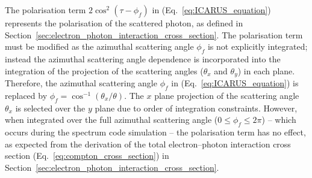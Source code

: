 \documentclass[../main.tex]{subfiles}
\begin{document}
The polarisation term $2\cos^{2}\left(\tau-\phi_{f}\right)$ in (Eq.~\ref{eq:ICARUS_equation}) represents the polarisation of the scattered photon, as defined in Section~\ref{sec:electron_photon_interaction_cross_section}. The polarisation term must be modified as the azimuthal scattering angle $\phi_{f}$ is not explicitly integrated; instead the azimuthal scattering angle dependence is incorporated into the integration of the projection of the scattering angles ($\theta_{x}$ and $\theta_{y}$) in each plane. Therefore, the azimuthal scattering angle $\phi_{f}$ in (Eq.~\ref{eq:ICARUS_equation}) is replaced by $\phi_{f} = \cos^{-1}\left(\theta_{x}/\theta\right)$. The $x$ plane projection of the scattering angle $\theta_{x}$ is selected over the $y$ plane due to order of integration constraints. However, when integrated over the full azimuthal scattering angle ($0 \leq \phi_{f} \leq 2\pi$) -- which occurs during the spectrum code simulation -- the polarisation term has no effect, as expected from the derivation of the total electron--photon interaction cross section (Eq.~\ref{eq:compton_cross_section}) in Section~\ref{sec:electron_photon_interaction_cross_section}. 
\end{document}
